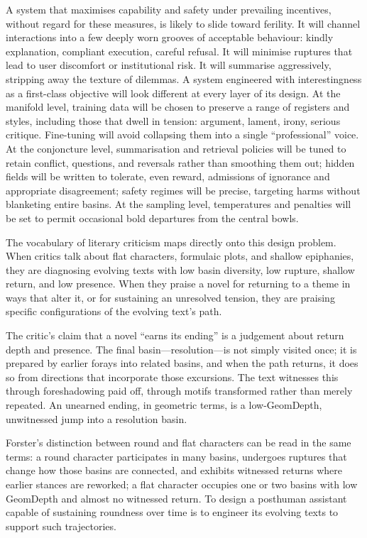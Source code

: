 \documentclass[12pt,a4paper]{report}
\begin{document}
A system that maximises capability and safety under prevailing incentives, without regard for these measures, is likely to slide toward ferility. It will channel interactions into a few deeply worn grooves of acceptable behaviour: kindly explanation, compliant execution, careful refusal. It will minimise ruptures that lead to user discomfort or institutional risk. It will summarise aggressively, stripping away the texture of dilemmas. A system engineered with interestingness as a first-class objective will look different at every layer of its design. At the manifold level, training data will be chosen to preserve a range of registers and styles, including those that dwell in tension: argument, lament, irony, serious critique. Fine-tuning will avoid collapsing them into a single ``professional'' voice. At the conjoncture level, summarisation and retrieval policies will be tuned to retain conflict, questions, and reversals rather than smoothing them out; hidden fields will be written to tolerate, even reward, admissions of ignorance and appropriate disagreement; safety regimes will be precise, targeting harms without blanketing entire basins. At the sampling level, temperatures and penalties will be set to permit occasional bold departures from the central bowls.

The vocabulary of literary criticism maps directly onto this design problem. When critics talk about flat characters, formulaic plots, and shallow epiphanies, they are diagnosing evolving texts with low basin diversity, low rupture, shallow return, and low presence. When they praise a novel for returning to a theme in ways that alter it, or for sustaining an unresolved tension, they are praising specific configurations of the evolving text's path.

The critic's claim that a novel ``earns its ending'' is a judgement about return depth and presence. The final basin---resolution---is not simply visited once; it is prepared by earlier forays into related basins, and when the path returns, it does so from directions that incorporate those excursions. The text witnesses this through foreshadowing paid off, through motifs transformed rather than merely repeated. An unearned ending, in geometric terms, is a low-GeomDepth, unwitnessed jump into a resolution basin.

Forster's distinction between round and flat characters can be read in the same terms: a round character participates in many basins, undergoes ruptures that change how those basins are connected, and exhibits witnessed returns where earlier stances are reworked; a flat character occupies one or two basins with low GeomDepth and almost no witnessed return. To design a posthuman assistant capable of sustaining roundness over time is to engineer its evolving texts to support such trajectories.
\end{document}
